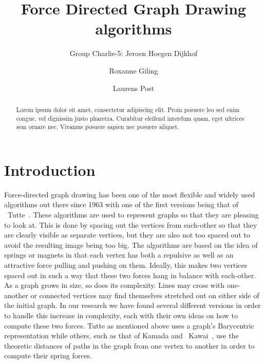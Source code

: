 \documentclass[a4paper,12pt,twoside]{article}
\begin{document}
\title{Force Directed Graph Drawing algorithms}
\author{Group Charlie-5: Jeroen Hoegen Dijkhof \and Roxanne Giling \and Laurens Post}
\maketitle
\begin{abstract}
Lorem ipsum dolor sit amet, consectetur adipiscing elit. Proin posuere leo sed enim congue, vel dignissim justo pharetra. Curabitur eleifend interdum quam, eget ultrices sem ornare nec. Vivamus posuere sapien nec posuere aliquet.
\end{abstract}
\newpage

\tableofcontents
\newpage

\section{Introduction}\label{s:Introduction}
Force-directed graph drawing has been one of the most flexible and widely used algorithms out there since 1963 with one of the first versions being that of ~Tutte~\cite{Tutte}. These algorithms are used to represent graphs so that they are pleasing to look at. This is done by spacing out the vertices from each-other so that they are clearly visible as separate vertices, but they are also not too spaced out to avoid the resulting image being too big. The algorithms are based on the idea of springs or magnets in that each vertex has both a repulsive as well as an attractive force pulling and pushing on them. Ideally, this makes two vertices spaced out in such a way that these two forces hang in balance with each-other. As a graph grows in size, so does its complexity. Lines may cross with one-another or connected vertices may find themselves stretched out on either side of the initial graph. In our research we have found several different versions in order to handle this increase in complexity, each with their own ideas on how to compute these two forces. Tutte as mentioned above uses a graph's Barycentric representation while others, such as that of Kamada and ~Kawai~\cite{Kawai}, use the theoretic distances of paths in the graph from one vertex to another in order to compute their spring forces.
\end{document}
